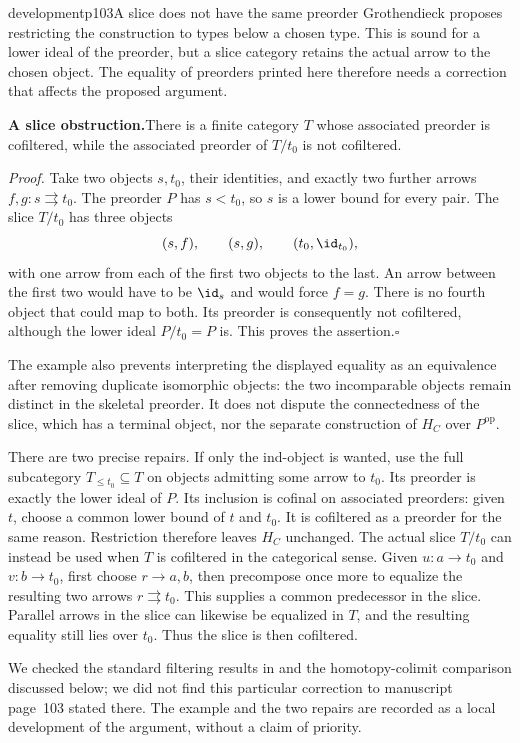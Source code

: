 \begin{dcomment}{development}{p103}{A slice does not have the same preorder}
Grothendieck proposes restricting the construction to types below a chosen type. This is sound for a lower ideal of the preorder, but a slice category retains the actual arrow to the chosen object. The equality of preorders printed here therefore needs a correction that affects the proposed argument.

\textbf{A slice obstruction.}\ours\quad There is a finite category $T$ whose associated preorder is cofiltered, while the associated preorder of $T/t_0$ is not cofiltered.

\emph{Proof.} Take two objects $s,t_0$, their identities, and exactly two further arrows $f,g:s\rightrightarrows t_0$. The preorder $P$ has $s<t_0$, so $s$ is a lower bound for every pair. The slice $T/t_0$ has three objects
\[
 (s,f),\qquad (s,g),\qquad(t_0,\id_{t_0}),
\]
with one arrow from each of the first two objects to the last. An arrow between the first two would have to be $\id_s$ and would force $f=g$. There is no fourth object that could map to both. Its preorder is consequently not cofiltered, although the lower ideal $P/t_0=P$ is. This proves the assertion.\hfill$\square$

The example also prevents interpreting the displayed equality as an equivalence after removing duplicate isomorphic objects: the two incomparable objects remain distinct in the skeletal preorder. It does not dispute the connectedness of the slice, which has a terminal object, nor the separate construction of $H_C$ over $P^{\mathrm{op}}$.

There are two precise repairs. If only the ind-object is wanted, use the full subcategory $T_{\le t_0}\subseteq T$ on objects admitting some arrow to $t_0$. Its preorder is exactly the lower ideal of $P$. Its inclusion is cofinal on associated preorders: given $t$, choose a common lower bound of $t$ and $t_0$. It is cofiltered as a preorder for the same reason. Restriction therefore leaves $H_C$ unchanged. The actual slice $T/t_0$ can instead be used when $T$ is cofiltered in the categorical sense. Given $u:a\to t_0$ and $v:b\to t_0$, first choose $r\to a,b$, then precompose once more to equalize the resulting two arrows $r\rightrightarrows t_0$. This supplies a common predecessor in the slice. Parallel arrows in the slice can likewise be equalized in $T$, and the resulting equality still lies over $t_0$. Thus the slice is then cofiltered.

We checked the standard filtering results in \citet[Categories, \S4.19]{StacksProject} and the homotopy-colimit comparison discussed below; we did not find this particular correction to manuscript page~103 stated there. The example and the two repairs are recorded as a local development of the argument, without a claim of priority.
\end{dcomment}

